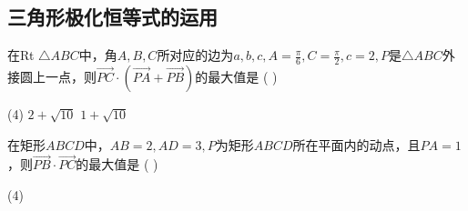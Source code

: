 \subsection{三角形极化恒等式的运用}

\begin{example}
    在Rt $\triangle ABC$中，角$A, B, C$所对应的边为$a, b, c, A = \frac{\pi}{6}, C = \frac{\pi}{2}, c=2, P$是$\triangle ABC$外接圆上一点，则$\overrightarrow{PC} \cdot (\overrightarrow{PA} + \overrightarrow{PB})$的最大值是 ( \hspace{1.5cm} )
    \begin{tasks}(4) %
        \task $2+\sqrt{10}$
        \task $1+\sqrt{10}$
    \end{tasks}
\end{example}

\begin{example}
    在矩形$ABCD$中，$AB=2, AD=3, P$为矩形$ABCD$所在平面内的动点，且$PA=1$，则$\overrightarrow{PB} \cdot \overrightarrow{PC}$的最大值是 ( \hspace{1.5cm} )
    \begin{tasks}(4)
    \end{tasks}
\end{example}

